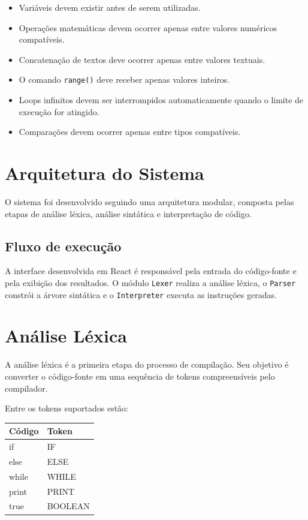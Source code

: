 \documentclass[a4paper,12pt]{article}
\begin{document}
\begin{itemize}
    \item Variáveis devem existir antes de serem utilizadas.
    \item Operações matemáticas devem ocorrer apenas entre valores numéricos compatíveis.
    \item Concatenação de textos deve ocorrer apenas entre valores textuais.
    \item O comando \texttt{range()} deve receber apenas valores inteiros.
    \item Loops infinitos devem ser interrompidos automaticamente quando o limite de execução for atingido.
    \item Comparações devem ocorrer apenas entre tipos compatíveis.
\end{itemize}

\section{Arquitetura do Sistema}

O sistema foi desenvolvido seguindo uma arquitetura modular, composta pelas etapas de análise léxica, análise sintática e interpretação de código.

\subsection{Fluxo de execução}

A interface desenvolvida em React é responsável pela entrada do código-fonte e pela exibição dos resultados. O módulo \texttt{Lexer} realiza a análise léxica, o \texttt{Parser} constrói a árvore sintática e o \texttt{Interpreter} executa as instruções geradas.

\section{Análise Léxica}

A análise léxica é a primeira etapa do processo de compilação. Seu objetivo é converter o código-fonte em uma sequência de tokens compreensíveis pelo compilador.

Entre os tokens suportados estão:

\begin{center}
\begin{tabular}{|l|l|}
\hline
\textbf{Código} & \textbf{Token} \\
\hline
if & IF \\
else & ELSE \\
while & WHILE \\
print & PRINT \\
true & BOOLEAN \\
\hline
\end{tabular}
\end{center}
\end{document}

